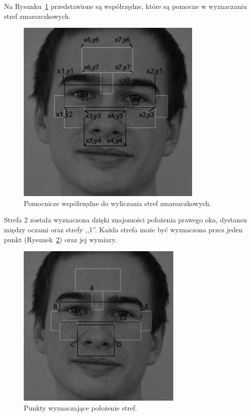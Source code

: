 \documentclass[a4paper,twoside,12pt]{book}
\begin{document}
    Na Rysunku~\ref{fig.wspolrzedneDoWyliczeniaStref} przedstawione są współrzędne, które są pomocne w wyznaczaniu
    stref zmarszczkowych.

    \begin{figure}
        \centering
        \includegraphics[width=9cm]{Obrazy/wspolrzedneDoWyliczeniaStref.jpg}
        \caption{Pomocnicze współrzędne do wyliczania stref zmarszczkowych.}
        \label{fig.wspolrzedneDoWyliczeniaStref}
    \end{figure}

    Strefa 2 została wyznaczona dzięki znajomości położenia prawego oka, dystansu między oczami oraz strefy ,,1''.
    Każda strefa może być wyznaczona przez jeden punkt (Rysunek~\ref{fig.wykrywanieStrefZmarszczkowychPunkty})
    oraz jej wymiary.

    \begin{figure}
        \centering
        \includegraphics[width=8cm]{Obrazy/wykrywanieStrefZmarszczkowychPunkty.jpg}
        \caption{Punkty wyznaczające położenie stref.}
        \label{fig.wykrywanieStrefZmarszczkowychPunkty}
    \end{figure}
\end{document}
